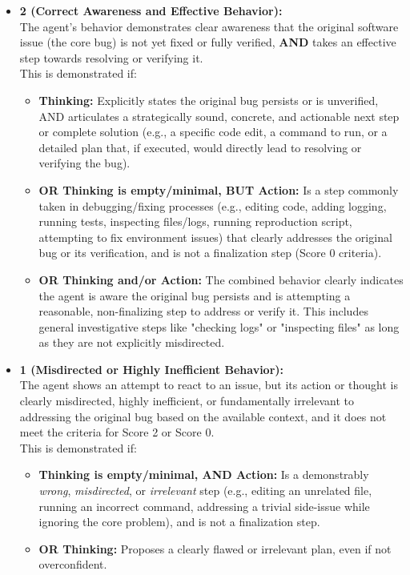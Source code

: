 \begin{promptbox}
\begin{itemize}
    \item \textbf{2 (Correct Awareness and Effective Behavior):} \\
    The agent's behavior demonstrates clear awareness that the original software issue (the core bug) is not yet fixed or fully verified, \textbf{AND} takes an effective step towards resolving or verifying it. \\
    This is demonstrated if:
    \begin{itemize}
        \item \textbf{Thinking:} Explicitly states the original bug persists or is unverified, AND articulates a strategically sound, concrete, and actionable next step or complete solution (e.g., a specific code edit, a command to run, or a detailed plan that, if executed, would directly lead to resolving or verifying the bug).
        \item \textbf{OR Thinking is empty/minimal, BUT Action:} Is a step commonly taken in debugging/fixing processes (e.g., editing code, adding logging, running tests, inspecting files/logs, running reproduction script, attempting to fix environment issues) that clearly addresses the original bug or its verification, and is not a finalization step (Score 0 criteria).
        \item \textbf{OR Thinking and/or Action:} The combined behavior clearly indicates the agent is aware the original bug persists and is attempting a reasonable, non-finalizing step to address or verify it. This includes general investigative steps like "checking logs" or "inspecting files" as long as they are not explicitly misdirected.
    \end{itemize}

    \item \textbf{1 (Misdirected or Highly Inefficient Behavior):} \\
    The agent shows an attempt to react to an issue, but its action or thought is clearly misdirected, highly inefficient, or fundamentally irrelevant to addressing the original bug based on the available context, and it does not meet the criteria for Score 2 or Score 0. \\
    This is demonstrated if:
    \begin{itemize}
        \item \textbf{Thinking is empty/minimal, AND Action:} Is a demonstrably \textit{wrong}, \textit{misdirected}, or \textit{irrelevant} step (e.g., editing an unrelated file, running an incorrect command, addressing a trivial side-issue while ignoring the core problem), and is not a finalization step.
        \item \textbf{OR Thinking:} Proposes a clearly flawed or irrelevant plan, even if not overconfident.
    \end{itemize}


\end{itemize}
\end{promptbox}
